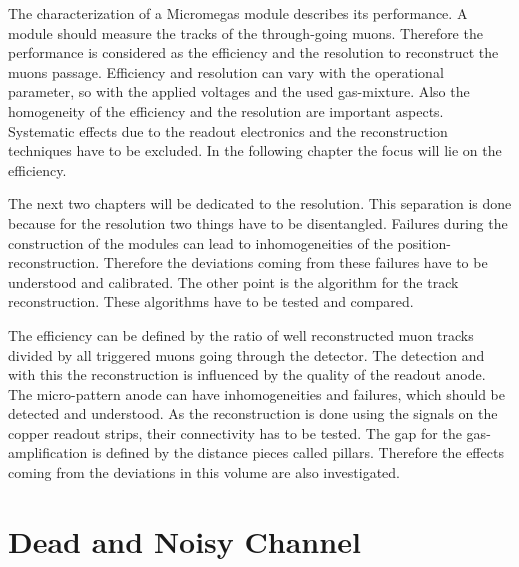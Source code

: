 \documentclass[
twoside,            %
BCOR1.4cm,          %
10pt,               %
headings=normal,    %
headsepline,        %
clearplainpage,		%
final,              %
div=14,
open=right,
bibliography=toc
]{scrreprt}
\begin{document}
The characterization of a Micromegas module describes its performance.
A module should measure the tracks of the through-going muons.
Therefore the performance is considered as the efficiency and the resolution to reconstruct the muons passage. 
Efficiency and resolution can vary with the operational parameter, so with the applied voltages and the used gas-mixture.
Also the homogeneity of the efficiency and the resolution are important aspects.
Systematic effects due to the readout electronics and the reconstruction techniques have to be excluded.
In the following chapter the focus will lie on the efficiency.

The next two chapters will be dedicated to the resolution. 
This separation is done because for the resolution two things have to be disentangled.
Failures during the construction of the modules can lead to inhomogeneities of the position-reconstruction.
Therefore the deviations coming from these failures have to be understood and calibrated.
The other point is the algorithm for the track reconstruction.
These algorithms have to be tested and compared.

The efficiency can be defined by the ratio of well reconstructed muon tracks divided by all triggered muons going through the detector.
The detection and with this the reconstruction is influenced by the quality of the readout anode.
The micro-pattern anode can have inhomogeneities and failures, which should be detected and understood.
As the reconstruction is done using the signals on the copper readout strips, their connectivity has to be tested.
The gap for the gas-amplification is defined by the distance pieces called pillars.
Therefore the effects coming from the deviations in this volume are also investigated.

\section{Dead and Noisy Channel}\label{deadNnoisy}
\end{document}
